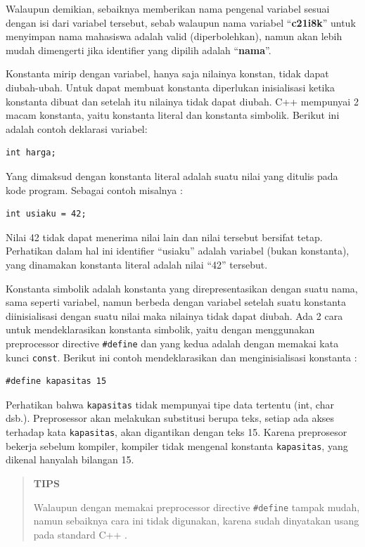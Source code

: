 Walaupun demikian, sebaiknya memberikan nama pengenal variabel sesuai
dengan isi dari variabel tersebut, sebab walaupun nama variabel
``\textbf{c21i8k}'' untuk menyimpan nama mahasiswa adalah valid
(diperbolehkan), namun akan lebih mudah dimengerti jika identifier yang
dipilih adalah ``\textbf{nama}''.

Konstanta mirip dengan variabel, hanya saja nilainya konstan, tidak
dapat diubah-ubah. Untuk dapat membuat konstanta diperlukan inisialisasi
ketika konstanta dibuat dan setelah itu nilainya tidak dapat diubah. C++
mempunyai 2 macam konstanta, yaitu konstanta literal dan konstanta
simbolik. Berikut ini adalah contoh deklarasi variabel:

\begin{verbatim}
int harga;
\end{verbatim}

Yang dimaksud dengan konstanta literal adalah suatu nilai yang ditulis
pada kode program. Sebagai contoh misalnya :

\begin{verbatim}
int usiaku = 42;
\end{verbatim}

Nilai 42 tidak dapat menerima nilai lain dan nilai tersebut bersifat
tetap. Perhatikan dalam hal ini identifier ``usiaku'' adalah variabel
(bukan konstanta), yang dinamakan konstanta literal adalah nilai ``42''
tersebut.

Konstanta simbolik adalah konstanta yang direpresentasikan dengan suatu
nama, sama seperti variabel, namun berbeda dengan variabel setelah suatu
konstanta diinisialisasi dengan suatu nilai maka nilainya tidak dapat
diubah. Ada 2 cara untuk mendeklarasikan konstanta simbolik, yaitu
dengan menggunakan preprocessor directive \texttt{\#define} dan yang
kedua adalah dengan memakai kata kunci \texttt{const}. Berikut ini
contoh mendeklarasikan dan menginisialisasi konstanta :

\begin{verbatim}
#define kapasitas 15
\end{verbatim}

Perhatikan bahwa \texttt{kapasitas} tidak mempunyai tipe data tertentu
(int, char dsb.). Preprosessor akan melakukan substitusi berupa teks,
setiap ada akses terhadap kata \texttt{kapasitas}, akan digantikan
dengan teks 15. Karena preprosesor bekerja sebelum kompiler, kompiler
tidak mengenal konstanta \texttt{kapasitas}, yang dikenal hanyalah
bilangan 15.
\begin{quotation}
	\textbf{TIPS} 
	
	Walaupun
	dengan memakai preprocessor directive \texttt{\#define} tampak mudah,
	namun sebaiknya cara ini tidak digunakan, karena sudah dinyatakan usang
	pada standard C++ .
\end{quotation}
 

